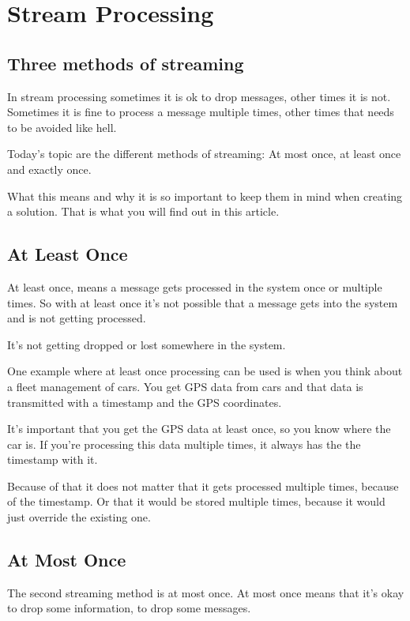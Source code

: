 \documentclass[12pt, numbers=noenddot]{scrreprt} %
\begin{document}
\section{Stream Processing}
\subsection{Three methods of streaming}

In stream processing sometimes it is ok to drop messages, other times it is not. Sometimes it is fine to process a message multiple times, other times that needs to be avoided like hell.

Today’s topic are the different methods of streaming: At most once, at least once and exactly once.

What this means and why it is so important to keep them in mind when creating a solution. That is what you will find out in this article.

\subsection{At Least Once}

At least once, means a message gets processed in the system once or multiple times. So with at least once it’s not possible that a message gets into the system and is not getting processed.

It’s not getting dropped or lost somewhere in the system.

One example where at least once processing can be used is when you think about a fleet management of cars. You get GPS data from cars and that data is transmitted with a timestamp and the GPS coordinates.

It’s important that you get the GPS data at least once, so you know where the car is. If you’re processing this data multiple times, it always has the the timestamp with it.

Because of that it does not matter that it gets processed multiple times, because of the timestamp. Or that it would be stored multiple times, because it would just override the existing one.

\subsection{At Most Once}

The second streaming method is at most once. At most once means that it’s okay to drop some information, to drop some messages.
\end{document}
